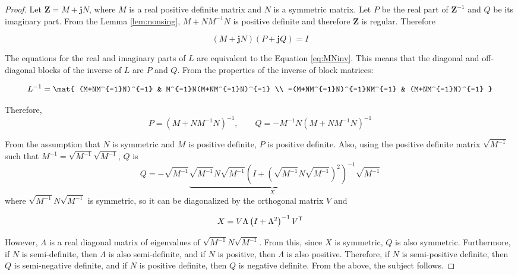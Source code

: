 \documentclass[graybox, envcountchap]{svmult}
\begin{document}
\begin{proof}
Let $\bm{Z} = M + \bm{j} N$, where $M$ is a real positive definite matrix and
$N$ is a symmetric matrix. Let $P$ be the real part of $\bm{Z}^{-1}$ and $Q$ be
its imaginary part. From the Lemma \ref{lem:nonsing}, $M+NM^{-1}N$ is positive
definite and therefore $\bm{Z}$ is regular. Therefore

\[
  (M+ \bm{j} N)(P+ \bm{j} Q)=I
\]

The equations for the real and imaginary parts of $L$ are equivalent to the
Equation \ref{eq:MNinv}. This means that the diagonal and off-diagonal blocks of
the inverse of $L$ are $P$ and $Q$. From the properties of the inverse of block
matrices:

\begin{equation*}
  L^{-1}=
    \mat{
      (M+NM^{-1}N)^{-1} & M^{-1}N(M+NM^{-1}N)^{-1} \\
      -(M+NM^{-1}N)^{-1}NM^{-1} & (M+NM^{-1}N)^{-1}
    }
\end{equation*}

Therefore,
\begin{equation*}
  P=(M+NM^{-1}N)^{-1},\qquad
  Q=-M^{-1}N(M+NM^{-1}N)^{-1}
\end{equation*}

From the assumption that $N$ is symmetric and $M$ is positive definite, $P$ is
positive definite. Also, using the positive definite matrix $\sqrt{M^{-1}}$ such
that $M^{-1}=\sqrt{M^{-1}}\sqrt{M^{-1}}$, $Q$ is
\begin{equation*}
  Q=-\sqrt{M^{-1}} 
  \underbrace{
    \sqrt{M^{-1}} N \sqrt{M^{-1}}
    \left(
    I + (\sqrt{M^{-1}} N \sqrt{M^{-1}} )^2
    \right)^{-1}
  }_{X}
  \sqrt{M^{-1}}
\end{equation*}
where $\sqrt{M^{-1}} N \sqrt{M^{-1}}$ is symmetric, so it can be diagonalized by
the orthogonal matrix $V$ and

\begin{equation*}
  X = V \Lambda \left(
  I + \Lambda^2
  \right)^{-1}
  V^{\sf T}
\end{equation*}

However, $\Lambda$ is a real diagonal matrix of eigenvalues of $\sqrt{M^{-1}} N
\sqrt{M^{-1}}$. From this, since $X$ is symmetric, $Q$ is also symmetric.
Furthermore, if $N$ is semi-definite, then $\Lambda$ is also semi-definite, and
if $N$ is positive, then $\Lambda$ is also positive. Therefore, if $N$ is
semi-positive definite, then $Q$ is semi-negative definite, and if $N$ is
positive definite, then $Q$ is negative definite. From the above, the subject
follows.
\end{proof}
\end{document}
